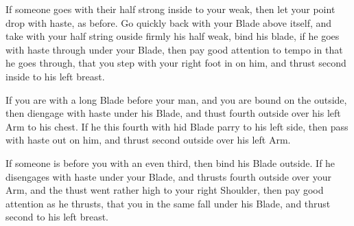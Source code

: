 \newpage


\newpage



If someone goes with their half strong inside to your weak, then let
your point drop with haste, as before. Go quickly back with your Blade
above itself, and take with your half string ouside firmly his half
weak, bind his blade, if he goes with haste through under your Blade,
then pay good attention to tempo in that he goes through, that you
step with your right foot in on him, and thrust second inside to his
left breast.

\exercise{}

If you are with a long Blade before your man, and you are bound on the
outside, then diengage with haste under his Blade, and thust fourth
outside over his left Arm to his chest. If he this fourth with hid
Blade parry to his left side, then pass with haste out on him, and
thrust second outside over his left Arm.

\exercise{}

If someone is before you with an even third, then bind his Blade
outside. If he disengages with haste under your Blade, and thrusts
fourth outside over your Arm, and the thust went rather high to your
right Shoulder, then pay good attention as he thrusts, that you in the
same fall under his Blade, and thrust second to his left breast.

